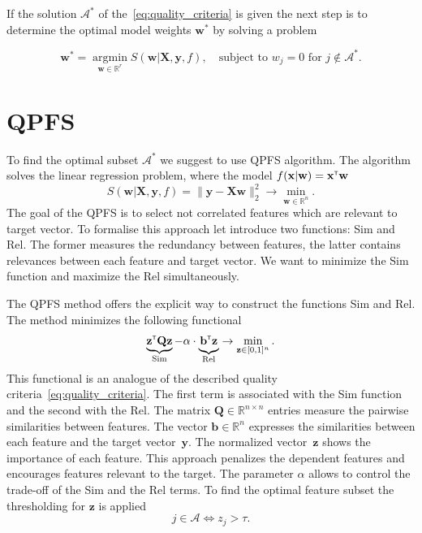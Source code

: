\documentclass[a4paper,12pt]{article}
\theoremstyle{plain} %
\theoremstyle{definition} %
\theoremstyle{remark} %
\newcommand{\bw}{\mathbf{w}}
\newcommand{\by}{\mathbf{y}}
\newcommand{\bx}{\mathbf{x}}
\newcommand{\bz}{\mathbf{z}}
\newcommand{\cA}{\mathcal{A}}
\newcommand{\bQ}{\mathbf{Q}}
\newcommand{\bbR}{\mathbb{R}}
\newcommand{\bX}{\mathbf{X}}
\newcommand{\T}{{\text{\tiny\sffamily\upshape\mdseries T}}}
\newcommand{\argmin}{\mathop{\arg \min}\limits}
\begin{document}
	If the solution $\cA^*$ of the~\ref{eq:quality_criteria} is given the next step is to determine the optimal model weights	$\bw^*$ by solving a problem
	
	\begin{equation}
		\bw^* = \argmin_{\bw \in \bbR^r} S(\bw | \bX, \by, f), \quad \text{subject to } w_j = 0 \text{ for } j \notin \cA^*.
		\label{eq:reduced_error_function}
	\end{equation}
	
	\section*{QPFS}
	
	To find the optimal subset $\cA^*$ we suggest to use QPFS algorithm.
	The algorithm solves the linear regression problem, where the model $f(\bx | \bw) = \bx^{\T} \bw$
	\[
		S(\bw | \bX, \by, f) =  \| \by - \bX \bw\|_2^2 \rightarrow\min_{\bw \in \bbR^{n}}.
	\]
	The goal of the QPFS is to select not correlated features which are relevant to target vector.
	To formalise this approach let introduce two functions: Sim and Rel. 
	The former measures the redundancy between features, the latter contains relevances between each feature and target vector. 
	We want to minimize the Sim function and maximize the Rel simultaneously.
	
	The QPFS method offers the explicit way to construct the functions Sim and Rel. 
	The method minimizes the following functional
	\begin{equation}
		\underbrace{\bz^{\T} \bQ \bz}_{\text{Sim}} - \alpha \cdot \underbrace{\vphantom{()} \mathbf{b}^{\T} \bz}_{\text{Rel}} \rightarrow \min_{\bz \in [0, 1]^n}.
		\label{eq:quadratic_problem}
	\end{equation}
	This functional is an analogue of the described quality criteria~\ref{eq:quality_criteria}.
  	The first term is associated with the Sim function and the second with the Rel. 
  	The matrix $\bQ \in \bbR^{n \times n}$ entries measure the pairwise similarities between features. 
  	The vector $\mathbf{b} \in \bbR^n$ expresses the similarities between each feature and the target vector~$\by$.
  	The normalized vector~$\bz$ shows the importance of each feature. 
  	This approach penalizes the dependent features and encourages features relevant to the target. 
  	The parameter $\alpha$ allows to control the trade-off of the Sim and the Rel terms.
  	To find the optimal feature subset the thresholding for $\bz$ is applied
  	\[
  		j \in \mathcal{A} \Leftrightarrow z_j > \tau.
  	\]
  	
\end{document}
